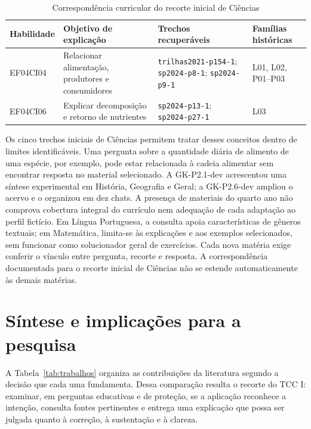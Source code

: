 \begin{table}[htbp]\centering\small\SingleSpacing
\caption{Correspondência curricular do recorte inicial de Ciências}\label{tab:curriculo}
\begin{tabularx}{\textwidth}{L{2.1cm} Y Y L{1.8cm}}
\toprule Habilidade & Objetivo de explicação & Trechos recuperáveis & Famílias históricas \\\midrule
EF04CI04 & Relacionar alimentação, produtores e consumidores & \nolinkurl{trilhas2021-p154-1}; \nolinkurl{sp2024-p8-1}; \nolinkurl{sp2024-p9-1} & L01, L02, P01--P03 \\
EF04CI06 & Explicar decomposição e retorno de nutrientes & \nolinkurl{sp2024-p13-1}; \nolinkurl{sp2024-p27-1} & L03 \\
\bottomrule\end{tabularx}
\end{table}

Os cinco trechos iniciais de Ciências permitem tratar desses conceitos dentro de limites identificáveis. Uma pergunta sobre a quantidade diária de alimento de uma espécie, por exemplo, pode estar relacionada à cadeia alimentar sem encontrar resposta no material selecionado. A GK-P2.1-dev acrescentou uma síntese experimental em História, Geografia e Geral; a GK-P2.6-dev ampliou o acervo e o organizou em dez chats. A presença de materiais do quarto ano não comprova cobertura integral do currículo nem adequação de cada adaptação ao perfil fictício. Em Língua Portuguesa, a consulta apoia características de gêneros textuais; em Matemática, limita-se às explicações e aos exemplos selecionados, sem funcionar como solucionador geral de exercícios. Cada nova matéria exige conferir o vínculo entre pergunta, recorte e resposta. A correspondência documentada para o recorte inicial de Ciências não se estende automaticamente às demais matérias.

\section{Síntese e implicações para a pesquisa}

A Tabela~\ref{tab:trabalhos} organiza as contribuições da literatura segundo a decisão que cada uma fundamenta. Dessa comparação resulta o recorte do TCC I: examinar, em perguntas educativas e de proteção, se a aplicação reconhece a intenção, consulta fontes pertinentes e entrega uma explicação que possa ser julgada quanto à correção, à sustentação e à clareza.

